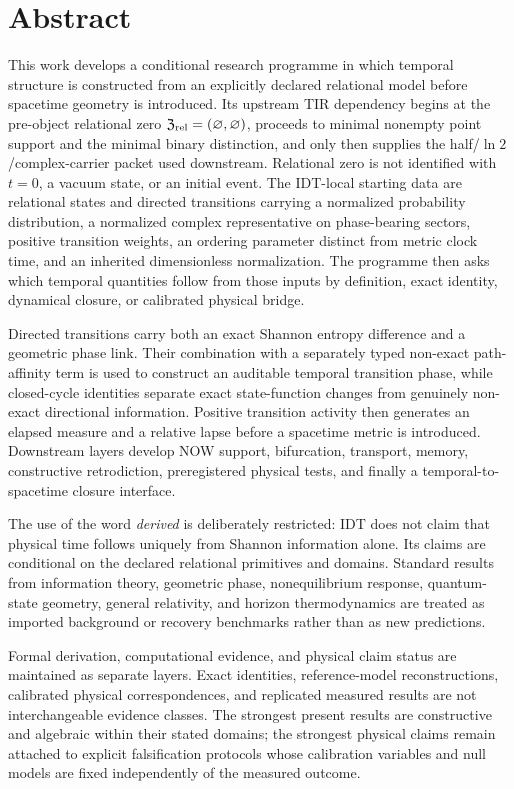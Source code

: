 \chapter*{Abstract}

This work develops a conditional research programme in which temporal structure is constructed from an explicitly declared relational model before spacetime geometry is introduced. Its upstream TIR dependency begins at the pre-object relational zero \(\mathfrak Z_{\rm rel}=(\varnothing,\varnothing)\), proceeds to minimal nonempty point support and the minimal binary distinction, and only then supplies the half/\(\ln2\)/complex-carrier packet used downstream. Relational zero is not identified with \(t=0\), a vacuum state, or an initial event. The IDT-local starting data are relational states and directed transitions carrying a normalized probability distribution, a normalized complex representative on phase-bearing sectors, positive transition weights, an ordering parameter distinct from metric clock time, and an inherited dimensionless normalization. The programme then asks which temporal quantities follow from those inputs by definition, exact identity, dynamical closure, or calibrated physical bridge.

Directed transitions carry both an exact Shannon entropy difference and a geometric phase link. Their combination with a separately typed non-exact path-affinity term is used to construct an auditable temporal transition phase, while closed-cycle identities separate exact state-function changes from genuinely non-exact directional information. Positive transition activity then generates an elapsed measure and a relative lapse before a spacetime metric is introduced. Downstream layers develop NOW support, bifurcation, transport, memory, constructive retrodiction, preregistered physical tests, and finally a temporal-to-spacetime closure interface.

The use of the word \emph{derived} is deliberately restricted: IDT does not claim that physical time follows uniquely from Shannon information alone. Its claims are conditional on the declared relational primitives and domains. Standard results from information theory, geometric phase, nonequilibrium response, quantum-state geometry, general relativity, and horizon thermodynamics are treated as imported background or recovery benchmarks rather than as new predictions.

Formal derivation, computational evidence, and physical claim status are maintained as separate layers. Exact identities, reference-model reconstructions, calibrated physical correspondences, and replicated measured results are not interchangeable evidence classes. The strongest present results are constructive and algebraic within their stated domains; the strongest physical claims remain attached to explicit falsification protocols whose calibration variables and null models are fixed independently of the measured outcome.

